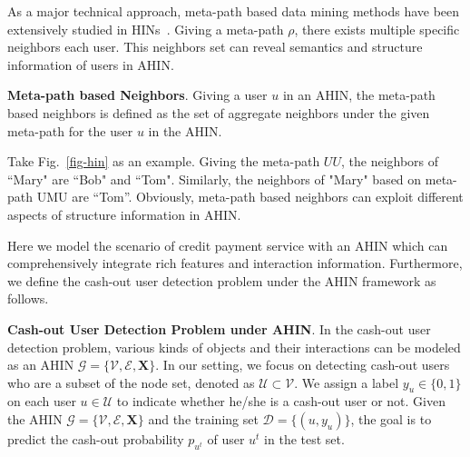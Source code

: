 As a major technical approach, meta-path based data mining methods have been extensively studied in HINs~\citep{shi2017survey}. Giving a meta-path $\rho$, there exists multiple specific neighbors \wrt each user. This neighbors set can reveal semantics and structure information of users in AHIN. 
\begin{myDef}
\textbf{Meta-path based Neighbors}. Giving a user $u$ in an AHIN, the meta-path based neighbors is defined as the set of aggregate neighbors under the given meta-path for the user $u$ in the AHIN.
\end{myDef}

\begin{exmp}
Take Fig.~\ref{fig-hin} as an example. Giving the meta-path $UU$, the neighbors of ``Mary" are ``Bob" and ``Tom". Similarly, the neighbors of "Mary" based on meta-path UMU are ``Tom''. Obviously, meta-path based neighbors can exploit different aspects of structure information in AHIN.
\end{exmp}

Here we model the scenario of credit payment service with an AHIN which can comprehensively integrate rich features and  interaction information. Furthermore, we define the cash-out user detection problem under the AHIN framework as follows. 

\begin{myDef}
\textbf{Cash-out User Detection Problem under AHIN}. In the cash-out user detection problem, various kinds of objects and their interactions can be modeled as an AHIN $\mathcal{G} = \{\mathcal{V}, \mathcal{E}, \mathbf{X}\}$. In our setting, we focus on detecting cash-out users who are a subset of the node set, denoted as $\mathcal{U} \subset \mathcal{V}$. We assign a label $y_u \in \{0, 1\}$ on each user $u \in \mathcal{U}$ to indicate whether he/she is a cash-out user or not. Given the AHIN $\mathcal{G} = \{\mathcal{V}, \mathcal{E}, \mathbf{X}\}$ and the training set $\mathcal{D} = \{ (u, y_u) \}$, the goal is to predict the cash-out probability $p_{u^t}$ of user $u^t$ in the test set. %
\end{myDef}
